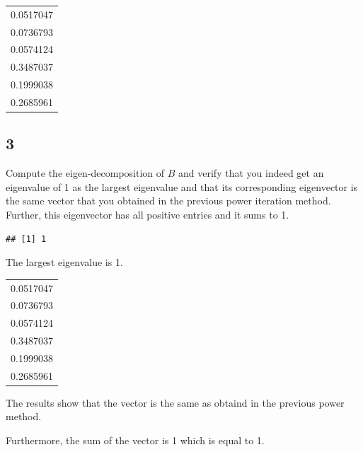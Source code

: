 \documentclass[]{article}
\newenvironment{Shaded}{\begin{snugshade}}{\end{snugshade}}
\newcommand{\KeywordTok}[1]{\textcolor[rgb]{0.13,0.29,0.53}{\textbf{{#1}}}}
\newcommand{\DecValTok}[1]{\textcolor[rgb]{0.00,0.00,0.81}{{#1}}}
\newcommand{\StringTok}[1]{\textcolor[rgb]{0.31,0.60,0.02}{{#1}}}
\newcommand{\NormalTok}[1]{{#1}}
\begin{document}
\begin{longtable}[]{@{}r@{}}
\toprule
0.0517047\tabularnewline
0.0736793\tabularnewline
0.0574124\tabularnewline
0.3487037\tabularnewline
0.1999038\tabularnewline
0.2685961\tabularnewline
\bottomrule
\end{longtable}

\newpage

\subsection{3}\label{section-2}

Compute the eigen-decomposition of \(B\) and verify that you indeed get
an eigenvalue of 1 as the largest eigenvalue and that its corresponding
eigenvector is the same vector that you obtained in the previous power
iteration method. Further, this eigenvector has all positive entries and
it sums to 1.

\begin{Shaded}
\end{Shaded}

\begin{verbatim}
## [1] 1
\end{verbatim}

The largest eigenvalue is 1.

\begin{Shaded}
\end{Shaded}

\begin{longtable}[]{@{}r@{}}
\toprule
0.0517047\tabularnewline
0.0736793\tabularnewline
0.0574124\tabularnewline
0.3487037\tabularnewline
0.1999038\tabularnewline
0.2685961\tabularnewline
\bottomrule
\end{longtable}

The results show that the vector is the same as obtaind in the previous
power method.

Furthermore, the sum of the vector is 1 which is equal to 1.
\end{document}
